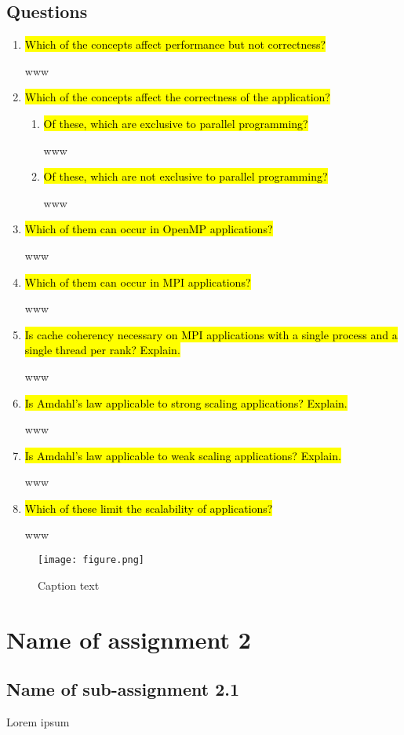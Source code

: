 \documentclass{article}
\begin{document}
\subsection{Questions}
\begin{enumerate}
	\item \hl{Which of the concepts affect performance but not correctness?}

	www

	\item \hl{Which of the concepts affect the correctness of the application?} ~

	\begin{enumerate}[label=\Alph*]
		\item \hl{Of these, which are exclusive to parallel programming?}

		www

		\item \hl{Of these, which are not exclusive to parallel programming?}

		www
	\end{enumerate}

	\item \hl{Which of them can occur in OpenMP applications?}

	www
	
	\item \hl{Which of them can occur in MPI applications?}

	www
	
	\item \hl{Is cache coherency necessary on MPI applications with a single process and a single thread per rank? Explain.}

	www
	
	\item \hl{Is Amdahl's law applicable to strong scaling applications? Explain.}

	www
	
	\item \hl{Is Amdahl's law applicable to weak scaling applications? Explain.}

	www
	
	\item \hl{Which of these limit the scalability of applications?}

	www
	
\end{enumerate}

\begin{figure}[h!] %
 	\begin{center}
 		\texttt{[image: figure.png]} %
 		\caption{Caption text}
 		\label{fig:figureLabelName}
 	\end{center}
\end{figure}

\section{Name of assignment 2}
\subsection{Name of sub-assignment 2.1}
Lorem ipsum
\end{document}

